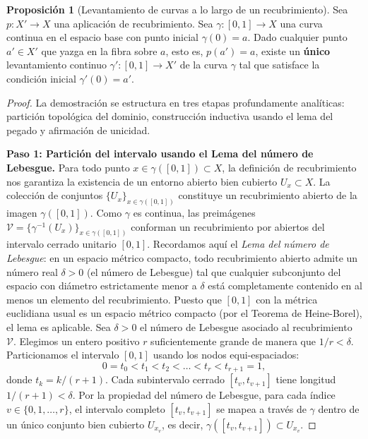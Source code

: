 \documentclass[11pt,a4paper]{article}
\theoremstyle{definition}
\newtheorem{proposicion}{Proposición}[section]
\theoremstyle{remark}
\numberwithin{equation}{section}
\begin{document}
\begin{proposicion}[Levantamiento de curvas a lo largo de un recubrimiento]
Sea $p: X' \to X$ una aplicación de recubrimiento. Sea $\gamma: [0, 1] \to X$ una curva continua en el espacio base con punto inicial $\gamma(0) = a$. Dado cualquier punto $a' \in X'$ que yazga en la fibra sobre $a$, esto es, $p(a') = a$, existe un \textbf{único} levantamiento continuo $\gamma': [0, 1] \to X'$ de la curva $\gamma$ tal que satisface la condición inicial $\gamma'(0) = a'$.
\end{proposicion}
\begin{proof}
La demostración se estructura en tres etapas profundamente analíticas: partición topológica del dominio, construcción inductiva usando el lema del pegado y afirmación de unicidad.

\textbf{Paso 1: Partición del intervalo usando el Lema del número de Lebesgue.}
Para todo punto $x \in \gamma([0,1]) \subset X$, la definición de recubrimiento nos garantiza la existencia de un entorno abierto bien cubierto $U_x \subset X$. La colección de conjuntos $\{ U_x \}_{x \in \gamma([0,1])}$ constituye un recubrimiento abierto de la imagen $\gamma([0,1])$. Como $\gamma$ es continua, las preimágenes $\mathcal{V} = \{ \gamma^{-1}(U_x) \}_{x \in \gamma([0,1])}$ conforman un recubrimiento por abiertos del intervalo cerrado unitario $[0,1]$.
Recordamos aquí el \textit{Lema del número de Lebesgue}: en un espacio métrico compacto, todo recubrimiento abierto admite un número real $\delta > 0$ (el número de Lebesgue) tal que cualquier subconjunto del espacio con diámetro estrictamente menor a $\delta$ está completamente contenido en al menos un elemento del recubrimiento. Puesto que $[0,1]$ con la métrica euclidiana usual es un espacio métrico compacto (por el Teorema de Heine-Borel), el lema es aplicable. Sea $\delta > 0$ el número de Lebesgue asociado al recubrimiento $\mathcal{V}$.
Elegimos un entero positivo $r$ suficientemente grande de manera que $1/r < \delta$. Particionamos el intervalo $[0,1]$ usando los nodos equi-espaciados:
\begin{equation}
0 = t_0 < t_1 < t_2 < \dots < t_r < t_{r+1} = 1,
\end{equation}
donde $t_k = k/(r+1)$. Cada subintervalo cerrado $[t_v, t_{v+1}]$ tiene longitud $1/(r+1) < \delta$. Por la propiedad del número de Lebesgue, para cada índice $v \in \{0, 1, \dots, r\}$, el intervalo completo $[t_v, t_{v+1}]$ se mapea a través de $\gamma$ dentro de un único conjunto bien cubierto $U_{x_v}$, es decir, $\gamma([t_v, t_{v+1}]) \subset U_{x_v}$.


\end{proof}
\end{document}
